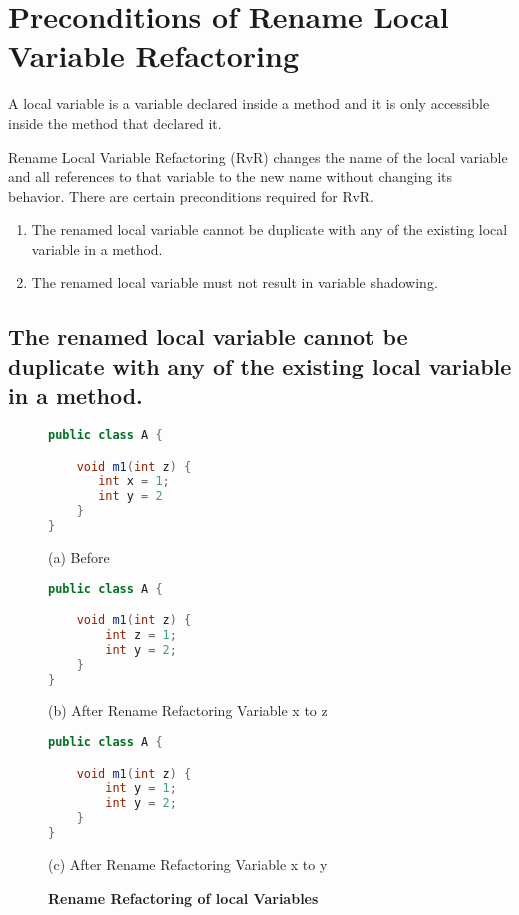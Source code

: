 \section{\textbf{Preconditions of Rename Local Variable Refactoring}}
A local variable is a variable declared inside a method and it is only accessible inside the method that declared it.

Rename Local Variable Refactoring (RvR) changes the name of the local variable and all references to that variable to the new name without changing its behavior. There are certain preconditions required for RvR.
\begin{enumerate}
\item The renamed local variable cannot be duplicate with any of the existing local variable in a method.
\item The renamed local variable must not result in variable shadowing.
\end{enumerate}

\subsection{The renamed local variable cannot be duplicate with any of the existing local variable in a method.}

\begin{figure}[th]
\centering
\begin{minipage}[t]{0.45\linewidth}
\begin{lstlisting}[language=java, basicstyle=\scriptsize\ttfamily,frame=single]
public class A {

    void m1(int z) {
       int x = 1; 
       int y = 2
    }
}
\end{lstlisting}
\centering(a) Before
\end{minipage}
\hfill
\begin{minipage}[t]{0.45\linewidth}
\begin{lstlisting}[language=java, basicstyle=\scriptsize\ttfamily,frame=single]
public class A {

    void m1(int z) {
        int z = 1; 
        int y = 2;
    }
}
\end{lstlisting}
\centering(b) After Rename Refactoring Variable x to z
\end{minipage}

\centering
\begin{minipage}[t]{0.45\linewidth}
\begin{lstlisting}[language=java, basicstyle=\scriptsize\ttfamily,frame=single]
public class A {

    void m1(int z) {
        int y = 1; 
        int y = 2;
    }
}
\end{lstlisting}
\centering(c) After Rename Refactoring Variable x to y
\end{minipage}
\caption{\textbf{Rename Refactoring of local Variables}}
\label{figure:precond5_1}
\end{figure}


